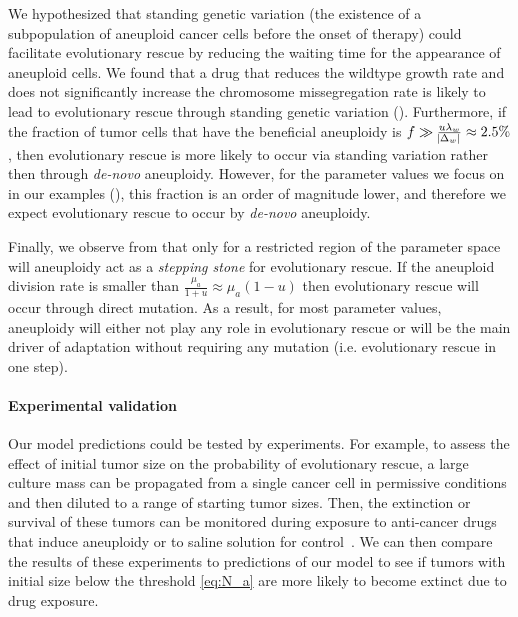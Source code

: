 \documentclass[12pt]{extarticle}
\begin{document}
We hypothesized that standing genetic variation (the existence of a subpopulation of aneuploid cancer cells before the onset of therapy) could facilitate evolutionary rescue by reducing the waiting time for the appearance of aneuploid cells. We found that a drug that reduces the wildtype growth rate and does not significantly increase the chromosome missegregation rate is likely to lead to evolutionary rescue through standing genetic variation ().
Furthermore, if the fraction of tumor cells that have the beneficial aneuploidy is $f\gg\frac{u\lambda_w}{\abs{\Delta_w}}\approx2.5\%$, then evolutionary rescue is more likely to occur via standing variation rather then through \emph{de-novo} aneuploidy. However, for the parameter values we focus on in our examples (), this fraction is an order of magnitude lower, and therefore we expect evolutionary rescue to occur by \emph{de-novo} aneuploidy.

Finally, we observe from  that only for a restricted region of the parameter space will aneuploidy act as a \emph{stepping stone} for evolutionary rescue. If the aneuploid division rate is smaller than $\frac{\mu_a}{1+u}\approx\mu_a(1-u)$ then evolutionary rescue will occur through direct mutation. As a result, for most parameter values, aneuploidy will either not play any role in evolutionary rescue or will be the main driver of adaptation without requiring any mutation (i.e. evolutionary rescue in one step).

\paragraph{Experimental validation}
Our model predictions could be tested by experiments. For example, to assess the effect of initial tumor size on the probability of evolutionary rescue, a large culture mass can be propagated from a single cancer cell in permissive conditions and then diluted to a  range of starting tumor sizes. Then, the extinction or survival of these tumors can be monitored during exposure to anti-cancer drugs that induce aneuploidy or to saline solution for control~\citep{ippolito2021gene}. 
We can then compare the results of these experiments to predictions of our model to see if tumors with initial size below the threshold \cref{eq:N_a} are more likely to become extinct due to drug exposure.   
\end{document}
